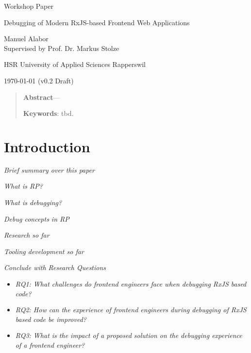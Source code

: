 \documentclass[12pt,a4paper]{article}
\newcommand{\version}{v0.2 Draft}
\begin{document}
\begin{centering}

	\Large{Workshop Paper}
	\par
	\Huge{Debugging of Modern RxJS-based Frontend Web Applications}
	\par
	\vspace{2ex}

	\normalsize{
		Manuel Alabor\\
		Supervised by Prof. Dr. Markus Stolze\\
		\par
		\vspace{2ex}
		HSR University of Applied Sciences Rapperswil\\
		\par
		\vspace{2ex}
		\today{} (\version)
	}
	\par
	\vspace{2ex}

	\begin{quotation}
		\small{
			\noindent\textbf{Abstract}---
		}
		\par
		\vspace{2ex}

		\small{
			\noindent\textbf{Keywords}: tbd.
		}
		\par
		\vspace{4ex}
	\end{quotation}
\end{centering}

\section{Introduction}

\emph{Brief summary over this paper}

\emph{What is RP?}

\emph{What is debugging?}

\emph{Debug concepts in RP}

\emph{Research so far}

\emph{Tooling development so far}

\emph{Conclude with Research Questions}

\begin{itemize}
	\item \emph{RQ1: What challenges do frontend engineers face when debugging RxJS based code?}
	\item \emph{RQ2: How can the experience of frontend engineers during debugging of RxJS based code be improved?}
	\item \emph{RQ3: What is the impact of a proposed solution on the debugging experience of a frontend engineer?}
\end{itemize}
\end{document}
